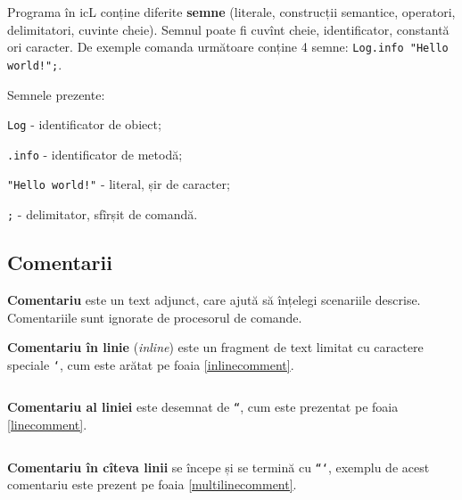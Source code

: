 Programa în icL conține diferite \textbf{semne} (literale, construcții semantice, operatori, delimitatori, cuvinte cheie). Semnul poate fi cuvînt cheie, identificator, constantă ori caracter. De exemple comanda următoare conține 4 semne: \texttt{Log.info "Hello world!";}.

Semnele prezente:
\begin{icItems}
\item
	\texttt{Log} - identificator de obiect;
\item
	\texttt{.info} - identificator de metodă;
\item
	\texttt{"Hello world!"} - literal, șir de caracter;
\item
	\texttt{;} - delimitator, sfîrșit de comandă.
\end{icItems}

\subsection{Comentarii}

\textbf{Comentariu} este un text adjunct, care ajută să înțelegi scenariile descrise. Comentariile sunt ignorate de procesorul de comande.

\textbf{Comentariu în linie} (\textit{inline}) este un fragment de text limitat cu caractere speciale \texttt{`}, cum este arătat pe foaia \ref{inlinecomment}.

\begin{sourcecode}
    \label{inlinecomment}
    \inputminted[linenos]{icl}{../sources/inlinecomment.icL}
\end{sourcecode}

\textbf{Comentariu al liniei} este desemnat de \texttt{``}, cum este prezentat pe foaia \ref{linecomment}.

\begin{sourcecode}
    \label{linecomment}
    \inputminted[linenos]{icl}{../sources/linecomment.icL}
\end{sourcecode}

\textbf{Comentariu în cîteva linii} se începe și se termină cu \texttt{```}, exemplu de acest comentariu este prezent pe foaia \ref{multilinecomment}.

\begin{sourcecode}
    \label{multilinecomment}
    \inputminted[linenos]{icl}{../sources/multilinecomment.icL}
\end{sourcecode}

